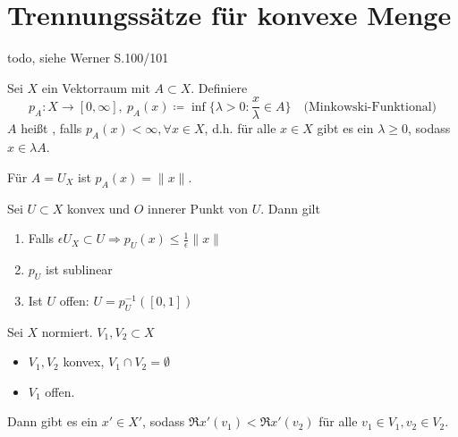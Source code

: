 

\section{Trennungssätze für konvexe Menge}



\begin{motivation}
	todo, siehe Werner S.100/101 %
\end{motivation}


\begin{definition}
	Sei $X$ ein Vektorraum mit $A \subset X$. Definiere 
		\[ p_{A} \colon X \rightarrow [0, \infty], ~ p_{A}(x) \coloneqq \inf \{ \lambda > 0 : \frac{x}{\lambda} \in A \} \quad \text{(Minkowski-Funktional)} \]
	$A$ hei{\ss}t , falls $p_{A}(x) < \infty, \forall x \in X$, d.h. für alle $ x \in X$ gibt es ein $\lambda \geq 0$, sodass $x \in \lambda A$.
\end{definition}


\begin{beispiel}
	Für $A = U_{X}$ ist $p_{A}(x) = \| x \|$.	
\end{beispiel}


\begin{prop}
	Sei $U \subset X$ konvex und $O$ innerer Punkt von $U$. Dann gilt
	\begin{enumerate}[label=\alph*\upshape)]
		\item Falls $\epsilon U_{X} \subset U \Rightarrow p_{U}(x) \leq \frac{1}{\epsilon} \| x \|$
		\item $p_{U}$ ist sublinear
		\item Ist $U$ offen: $U = p_{U}^{-1}([0 , 1])$
	\end{enumerate}	
\end{prop}


\begin{satz}[1. Trennungssatz]
	Sei $X$ normiert. $V_{1}, V_{2} \subset X$
	\begin{itemize}
		\item $V_{1}, V_{2}$ konvex, $V_{1} \cap V_{2} = \emptyset$
		\item $V_{1}$ offen.
	\end{itemize}
	Dann gibt es ein $x' \in X'$, sodass $\Re x'(v_{1}) < \Re x'(v_{2})$ für alle $v_{1} \in V_{1}, v_{2} \in V_{2}$.
\end{satz}

